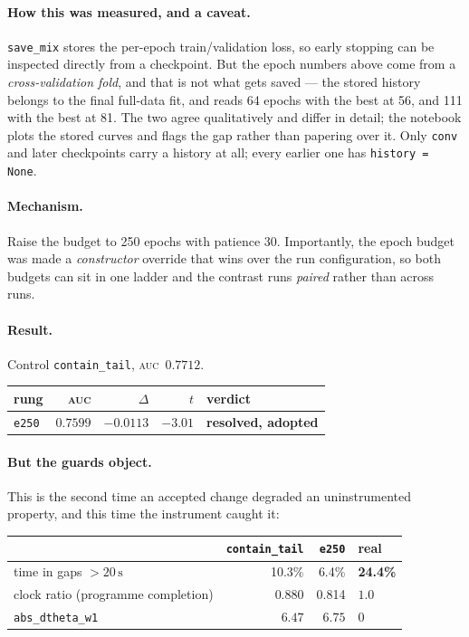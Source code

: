 \documentclass[11pt,a4paper]{article}
\newcommand{\uu}[1]{\ensuremath{\,\mathrm{#1}}}  %
\newcommand{\win}[1]{\textcolor{winc}{\textbf{#1}}}
\newcommand{\lose}[1]{\textcolor{losec}{#1}}
\newcommand{\auc}{\textsc{auc}}
\newcommand{\code}[1]{\texttt{\small #1}}
\begin{document}
\paragraph{How this was measured, and a caveat.} \code{save\_mix} stores the per-epoch
train/validation loss, so early stopping can be inspected directly from a checkpoint. But
the epoch numbers above come from a \emph{cross-validation fold}, and that is not what gets
saved --- the stored history belongs to the final full-data fit, and reads 64 epochs with
the best at 56, and 111 with the best at 81. The two agree qualitatively and differ in
detail; the notebook plots the stored curves and flags the gap rather than papering over
it. Only \code{conv} and later checkpoints carry a history at all; every earlier one has
\code{history = None}.

\paragraph{Mechanism.}
Raise the budget to 250 epochs with patience 30. Importantly, the epoch budget was made a
\emph{constructor} override that wins over the run configuration, so both budgets can sit
in one ladder and the contrast runs \emph{paired} rather than across runs.

\paragraph{Result.} Control \code{contain\_tail}, \auc\ $0.7712$.
\begin{center}\small
\begin{tabular}{lrrrl}
\toprule
rung & \auc{} & $\Delta$ & $t$ & verdict \\
\midrule
\code{e250} & $\mathbf{0.7599}$ & $\mathbf{-0.0113}$ & $-3.01$ & \win{resolved, adopted} \\
\bottomrule
\end{tabular}
\end{center}

\paragraph{But the guards object.} This is the second time an accepted change degraded an
uninstrumented property, and this time the instrument caught it:

\begin{center}\small
\begin{tabular}{lrrl}
\toprule
& \code{contain\_tail} & \code{e250} & real \\
\midrule
time in gaps $>20\uu{s}$ & 10.3\% & \lose{6.4\%} & \textbf{24.4\%} \\
clock ratio (programme completion) & $0.880$ & \lose{0.814} & $1.0$ \\
\code{abs\_dtheta\_w1} & $6.47$ & \lose{$6.75$} & $0$ \\
\bottomrule
\end{tabular}
\end{center}
\end{document}
